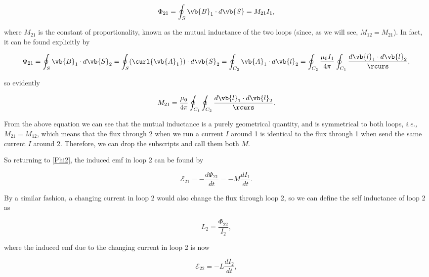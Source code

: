\documentclass[english,a4paper,12pt]{report}
\begin{document}
\begin{equation} \label{Phi2} 
    \Phi _{21} = \oint_{S} \vb{B} _{1} \cdot d\vb{S} = M_{21} I_1 ,    
\end{equation}

where \(M_{21} \) is the constant of proportionality, known as the mutual inductance of the two loops (since, as we will see, \(M_{12} = M_{21}  \)). In fact, it can be found explicitly by

\begin{equation}
    \Phi _{21} = \oint_{S} \vb{B} _{1} \cdot d \vb{S} _{2} = \oint_{S} (\curl{\vb{A} _{1} }  ) \cdot d\vb{S} _{2} = \oint_{C_2 } \vb{A} _{1} \cdot d \vb{l} _{2} = \oint_{C_2 } \frac{\mu _{0} I_1  }{4\pi }\oint_{C_1 } \frac{d \vb{l} _{1} \cdot d \vb{l} _{2}  }{\rcurs },            
\end{equation}

so evidently

\begin{equation}
    M_{21} = \frac{\mu _{0} }{4 \pi } \oint_{C_1 }\oint_{C_2 } \frac{d \vb{l} _{1} \cdot d \vb{l} _{2} }{\rcurs }.     
\end{equation}

From the above equation we can see that the mutual inductance is a purely geometrical quantity, and is symmetrical to both loops, \textit{i.e.,} \(M_{21} = M_{12}  \), which means that the flux through 2 when we run a current \(I\) around 1 is identical to the flux through 1 when send the same current \(I\) around 2. Therefore, we can drop the subscripts and call them both \(M\).

So returning to \cref{Phi2}, the induced emf in loop 2 can be found by 

\begin{equation}
    \mathcal{E}_{21} = - \frac{d\Phi _{21} }{dt} = - M \frac{dI_1 }{dt}.  
\end{equation}

By a similar fashion, a changing current in loop 2 would also change the flux through loop 2, so we can define the self inductance of loop 2 as 

\begin{equation}
    L_2  = \frac{\Phi _{22}  }{I_2 }, 
\end{equation}

where the induced emf due to the changing current in loop 2 is now

\begin{equation}
    \mathcal{E}_{22} = - L\frac{dI_2 }{dt},  
\end{equation}
\end{document}
